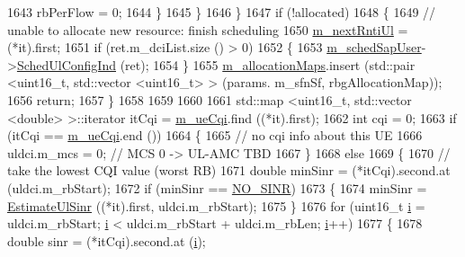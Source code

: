\begin{DoxyCode}
1643                   rbPerFlow = 0;                 
1644                 \}
1645             \}
1646         \}
1647       \textcolor{keywordflow}{if} (!allocated)
1648         \{
1649           \textcolor{comment}{// unable to allocate new resource: finish scheduling}
1650           \hyperlink{classns3_1_1TtaFfMacScheduler_a4342a2e63a980d852d3cb6ef1e77197b}{m\_nextRntiUl} = (*it).first;
1651           \textcolor{keywordflow}{if} (ret.m\_dciList.size () > 0)
1652             \{
1653               \hyperlink{classns3_1_1TtaFfMacScheduler_a950cb3e5f468debf1fa002171ff299f1}{m\_schedSapUser}->\hyperlink{classns3_1_1FfMacSchedSapUser_a1b89636256701a84d990db7db8aea874}{SchedUlConfigInd} (ret);
1654             \}
1655           \hyperlink{classns3_1_1TtaFfMacScheduler_a8931533e6964833d4e1da1e8c6d20313}{m\_allocationMaps}.insert (std::pair <uint16\_t, std::vector <uint16\_t> > (params.
      m\_sfnSf, rbgAllocationMap));
1656           \textcolor{keywordflow}{return};
1657         \}
1658 
1659 
1660 
1661       std::map <uint16\_t, std::vector <double> >::iterator itCqi = \hyperlink{classns3_1_1TtaFfMacScheduler_ac07e60af8c68f1cfac9b8666119af78f}{m\_ueCqi}.find ((*it).first);
1662       \textcolor{keywordtype}{int} cqi = 0;
1663       \textcolor{keywordflow}{if} (itCqi == \hyperlink{classns3_1_1TtaFfMacScheduler_ac07e60af8c68f1cfac9b8666119af78f}{m\_ueCqi}.end ())
1664         \{
1665           \textcolor{comment}{// no cqi info about this UE}
1666           uldci.m\_mcs = 0; \textcolor{comment}{// MCS 0 -> UL-AMC TBD}
1667         \}
1668       \textcolor{keywordflow}{else}
1669         \{
1670           \textcolor{comment}{// take the lowest CQI value (worst RB)}
1671           \textcolor{keywordtype}{double} minSinr = (*itCqi).second.at (uldci.m\_rbStart);
1672           \textcolor{keywordflow}{if} (minSinr == \hyperlink{cqa-ff-mac-scheduler_8h_a520d71777be043568160c783a9c65fd5}{NO\_SINR})
1673             \{
1674               minSinr = \hyperlink{classns3_1_1TtaFfMacScheduler_a51fcb3b65dbfff2b28d66930073a45c8}{EstimateUlSinr} ((*it).first, uldci.m\_rbStart);
1675             \}
1676           \textcolor{keywordflow}{for} (uint16\_t \hyperlink{bernuolliDistribution_8m_a6f6ccfcf58b31cb6412107d9d5281426}{i} = uldci.m\_rbStart; \hyperlink{bernuolliDistribution_8m_a6f6ccfcf58b31cb6412107d9d5281426}{i} < uldci.m\_rbStart + uldci.m\_rbLen; 
      \hyperlink{bernuolliDistribution_8m_a6f6ccfcf58b31cb6412107d9d5281426}{i}++)
1677             \{
1678               \textcolor{keywordtype}{double} sinr = (*itCqi).second.at (\hyperlink{bernuolliDistribution_8m_a6f6ccfcf58b31cb6412107d9d5281426}{i});

\end{DoxyCode}
